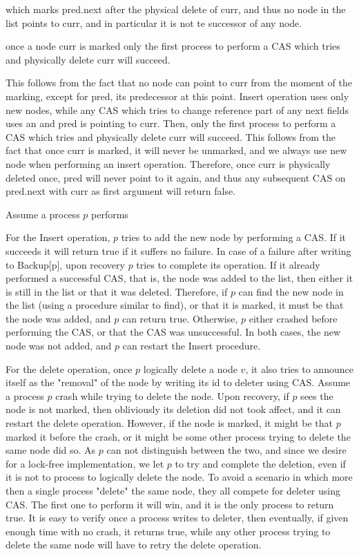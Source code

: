which marks pred.next after the physical delete of curr, and thus no node in the list points to curr, and in particular it is not te successor of any node.

once a node curr is marked only the first process to perform a CAS which tries and physically delete curr will succeed.


This follows from the fact that no node can point to curr from the moment of the marking, except for pred, its predecessor at this point. Insert operation uses only new nodes, while any CAS which tries to change reference part of any next fields uses an 
and pred is pointing to curr. Then, only the first process to perform a CAS which tries and physically delete curr will succeed. This follows from the fact that once curr is marked, it will never be unmarked, and we always use new node when performing an insert operation. Therefore, once curr is physically deleted once, pred will never point to it again, and thus any subsequent CAS on pred.next with curr as first argument will return false.

Assume a process $p$ performs 

For the Insert operation, $p$ tries to add the new node by performing a CAS. If it succeeds it will return true if it suffers no failure. In case of a failure after writing to Backup[p], upon recovery $p$ tries to complete its operation. If it already performed a successful CAS, that is, the node was added to the list, then either it is still in the list or that it was deleted. Therefore, if $p$ can find the new node in the list (using a procedure similar to find), or that it is marked, it must be that the node was added, and $p$ can return true. Otherwise, $p$ either crashed before performing the CAS, or that the CAS was unsuccessful. In both cases, the new node was not added, and $p$ can restart the Insert procedure.

For the delete operation, once $p$ logically delete a node $v$, it also tries to announce itself as the "removal" of the node by writing its id to deleter using CAS. Assume a process $p$ crash while trying to delete the node. Upon recovery, if $p$ sees the node is not marked, then obliviously its deletion did not took affect, and it can restart the delete operation. However, if the node is marked, it might be that $p$ marked it before the crash, or it might be some other process trying to delete the same node did so. As $p$ can not distinguish between the two, and since we desire for a lock-free implementation, we let $p$ to try and complete the deletion, even if it is not to process to logically delete the node. To avoid a scenario in which more then a single process "delete" the same node, they all compete for deleter using CAS. The first one to perform it will win, and it is the only process to return true. It is easy to verify once a process writes to deleter, then eventually, if given enough time with no crash, it returns true, while any other process trying to delete the same node will have to retry the delete operation.

 